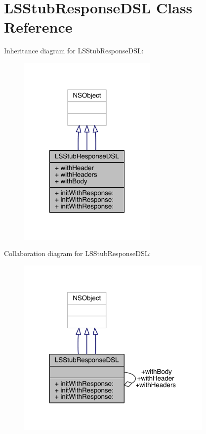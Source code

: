\hypertarget{interface_l_s_stub_response_d_s_l}{\section{L\-S\-Stub\-Response\-D\-S\-L Class Reference}
\label{interface_l_s_stub_response_d_s_l}
}


Inheritance diagram for L\-S\-Stub\-Response\-D\-S\-L\-:\nopagebreak
\begin{figure}[H]
\begin{center}
\leavevmode
\includegraphics[width=192pt]{interface_l_s_stub_response_d_s_l__inherit__graph}
\end{center}
\end{figure}


Collaboration diagram for L\-S\-Stub\-Response\-D\-S\-L\-:\nopagebreak
\begin{figure}[H]
\begin{center}
\leavevmode
\includegraphics[width=271pt]{interface_l_s_stub_response_d_s_l__coll__graph}
\end{center}
\end{figure}
